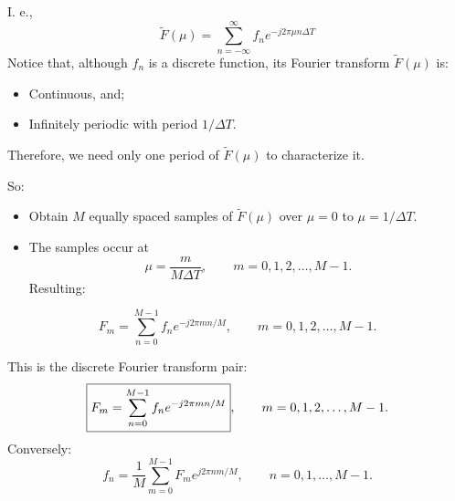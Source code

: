 
\begin{frame}
I. e.,
\begin{equation}
\boxed{
\tilde{F}(\mu) = \sum_{n=-\infty}^{\infty} f_{n} e^{-j2\pi \mu n\Delta T}
}
\end{equation}
Notice that, although $f_{n}$ is a discrete function, its Fourier transform $\tilde{F}(\mu)$ is:
\begin{itemize}
\item Continuous, and;
\item Infinitely periodic with period $1/\Delta T$.
\end{itemize}
Therefore, we need only one period of $\tilde{F}(\mu)$ to characterize it.
\end{frame}


\begin{frame}
So:
\begin{itemize}
\item Obtain $M$ equally spaced samples of $\tilde{F}(\mu)$ over $\mu=0$ to $\mu=1/\Delta T$.
\item The samples occur at
\begin{equation}
\mu = \dfrac{m}{M\Delta T}, \qquad m = 0,1,2,\ldots, M-1.
\end{equation}
Resulting:
\end{itemize}
\begin{equation}
\boxed{
F_{m} = \sum_{n=0}^{M-1} f_{n} e^{-j2\pi mn/M}
},
\qquad m = 0,1,2,\ldots, M-1.
\end{equation}
\end{frame}


\begin{frame}
This is the discrete Fourier transform pair:
\begin{equation}
\boxed{
F_{m} = \sum_{n=0}^{M-1} f_{n} e^{-j2\pi mn/M}
},
\qquad m = 0,1,2,\ldots, M-1.
\notag
\end{equation}
Conversely:
\begin{equation}
\boxed{
f_{n} = \dfrac{1}{M} \sum_{m=0}^{M-1} F_{m} e^{j2\pi nm/M}
},
\qquad n=0,1,\ldots,M-1.
\end{equation}
\end{frame}

